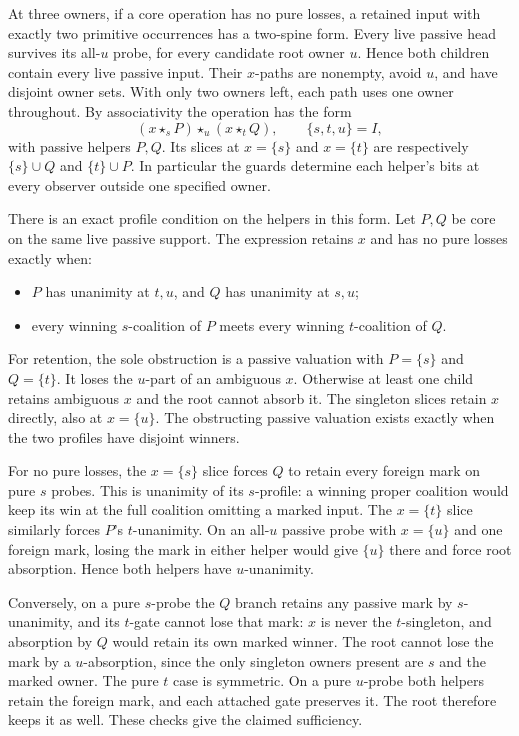 At three owners, if a core operation has no pure
losses, a retained input with exactly two primitive
occurrences has a two-spine form. Every live
passive head survives its all-$u$ probe, for every
candidate root owner $u$. Hence both children
contain every live passive input. Their $x$-paths
are nonempty, avoid $u$, and have disjoint owner
sets. With only two owners left, each path uses
one owner throughout. By associativity the
operation has the form
\[
 (x\star_s P)\star_u(x\star_t Q),
 \qquad \{s,t,u\}=I,
\]
with passive helpers $P,Q$. Its slices at $x=\{s\}$
and $x=\{t\}$ are respectively $\{s\}\cup Q$
and $\{t\}\cup P$. In particular the guards
determine each helper's bits at every observer
outside one specified owner.

There is an exact profile condition on the helpers
in this form. Let $P,Q$ be core on the same live
passive support. The expression retains $x$ and
has no pure losses exactly when:
\begin{itemize}
\item $P$ has unanimity at $t,u$, and $Q$ has
unanimity at $s,u$;
\item every winning $s$-coalition of $P$ meets
every winning $t$-coalition of $Q$.
\end{itemize}
For retention, the sole obstruction is a passive
valuation with $P=\{s\}$ and $Q=\{t\}$. It loses
the $u$-part of an ambiguous $x$. Otherwise at
least one child retains ambiguous $x$ and the
root cannot absorb it. The singleton slices retain
$x$ directly, also at $x=\{u\}$. The obstructing
passive valuation exists exactly when the two
profiles have disjoint winners.

For no pure losses, the $x=\{s\}$ slice forces
$Q$ to retain every foreign mark on pure $s$
probes. This is unanimity of its $s$-profile:
a winning proper coalition would keep its win
at the full coalition omitting a marked input.
The $x=\{t\}$ slice similarly forces $P$'s
$t$-unanimity. On an all-$u$ passive probe with
$x=\{u\}$ and one foreign mark, losing the mark
in either helper would give $\{u\}$ there and
force root absorption. Hence both helpers have
$u$-unanimity.

Conversely, on a pure $s$-probe the $Q$ branch
retains any passive mark by $s$-unanimity, and
its $t$-gate cannot lose that mark: $x$ is never
the $t$-singleton, and absorption by $Q$ would
retain its own marked winner. The root cannot
lose the mark by a $u$-absorption, since the only
singleton owners present are $s$ and the marked
owner. The pure $t$ case is symmetric. On a pure
$u$-probe both helpers retain the foreign mark,
and each attached gate preserves it. The root
therefore keeps it as well. These checks give
the claimed sufficiency.

